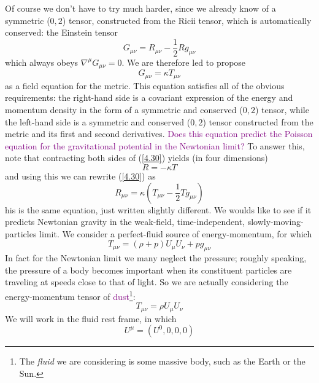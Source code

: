 Of course we don't have to try much harder, since we already know of a symmetric ($0,2$) tensor, constructed from the Ricii tensor, which is automatically conserved: the Einstein tensor
\begin{equation*}
    G_{\mu\nu}=R_{\mu\nu}-\frac{1}{2}Rg_{\mu\nu}
\end{equation*}
which always obeys $\nabla^\mu G_{\mu\nu}=0$. We are therefore led to propose
\begin{equation}\label{4.30}
    G_{\mu\nu}=\kappa T_{\mu\nu}
\end{equation}
as a field equation for the metric. This equation satisfies all of the obvious requirements: the right-hand side is a covariant expression of the energy and momentum density in the form of a symmetric and conserved ($0,2$) tensor, while the left-hand side is a symmetric and conserved ($0,2$) tensor constructed from the metric and its first and second derivatives. \textcolor{purple}{Does this equation predict the Poisson equation for the gravitational potential in the Newtonian limit?}
To answer this, note that contracting both sides of (\ref{4.30}) yields (in four dimensions)
\begin{equation}\label{4.31}
    R=-\kappa T
\end{equation}
and using this we can rewrite (\ref{4.30}) as
\begin{equation}\label{4.32}
    R_{\mu\nu}=\kappa \left(T_{\mu\nu}-\frac{1}{2}Tg_{\mu\nu}\right)
\end{equation}
his is the same equation, just written slightly different. We woulds like to see if it predicts Newtonian gravity in the weak-field, time-independent, slowly-moving-particles limit. We consider a perfect-fluid source of energy-momentum, for which
\begin{equation*}
    T_{\mu\nu}=(\rho +p)U_\mu U_\nu+ pg_{\mu\nu}
\end{equation*}
In fact for the Newtonian limit we many neglect the pressure; roughly speaking, the pressure of a body becomes important when its constituent particles are traveling at speeds close to that of light. So we are actually considering the energy-momentum tensor of \textcolor{purple}{dust}\footnote{The \textit{fluid} we are considering is some massive body, such as the Earth or the Sun.}:
\begin{equation*}
    T_{\mu\nu}=\rho U_\mu U_\nu
\end{equation*}
We will work in the fluid rest frame, in which
\begin{equation*}
    U^\mu = (U^0,0,0,0)
\end{equation*}
